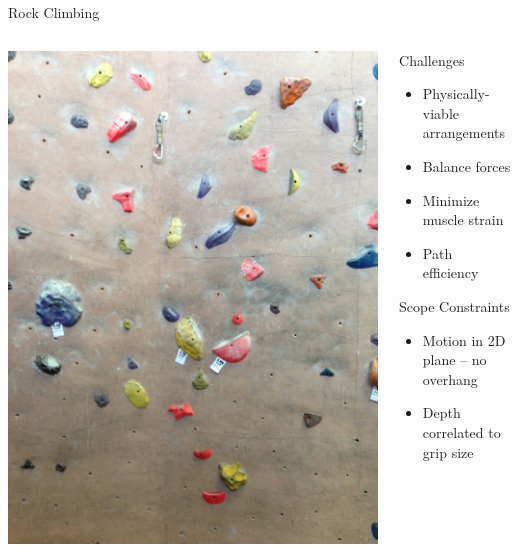 \documentclass{beamer}
\begin{document}
\begin{frame}{Rock Climbing}
\begin{columns}

\begin{column}[T]{.5\linewidth}
\includegraphics[height=\linewidth,angle=-90]{img/test2.JPG}
\end{column}
\begin{column}[T]{.6\linewidth}
\vspace{.8cm}
Challenges
\pause
\begin{itemize}
 \item Physically-viable arrangements
 \item Balance forces
 \item Minimize muscle strain
 \item Path efficiency
\end{itemize}
\pause
\vspace{.3cm}
Scope Constraints
\begin{itemize}
 \item Motion in 2D plane -- no overhang
 \item Depth correlated to grip size
\end{itemize}
\end{column}

\end{columns}
\end{frame}
\end{document}

